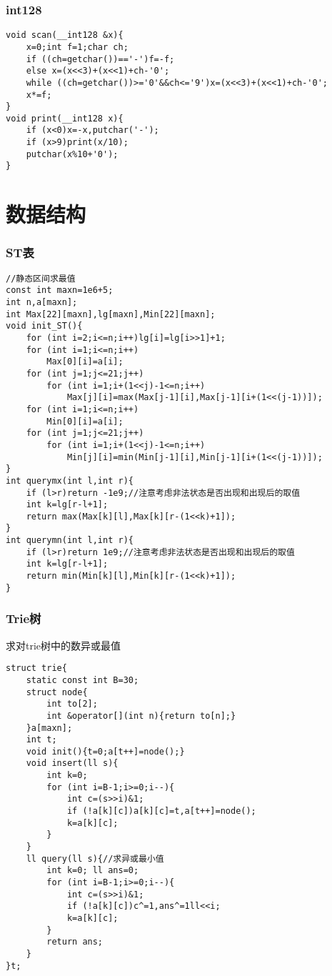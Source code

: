 \documentclass[12pt]{article}
\begin{document}
{{{\section{int128}

{\setmainfont{Consolas}
\begin{lstlisting}
void scan(__int128 &x){
	x=0;int f=1;char ch;
	if ((ch=getchar())=='-')f=-f;
	else x=(x<<3)+(x<<1)+ch-'0';
	while ((ch=getchar())>='0'&&ch<='9')x=(x<<3)+(x<<1)+ch-'0';
	x*=f;
}
void print(__int128 x){
	if (x<0)x=-x,putchar('-');
	if (x>9)print(x/10);
	putchar(x%10+'0');
}
\end{lstlisting}



\part{数据结构}

\section{ST表}

{\setmainfont{Consolas}
\begin{lstlisting}
//静态区间求最值
const int maxn=1e6+5;
int n,a[maxn];
int Max[22][maxn],lg[maxn],Min[22][maxn];
void init_ST(){
    for (int i=2;i<=n;i++)lg[i]=lg[i>>1]+1;
    for (int i=1;i<=n;i++)
        Max[0][i]=a[i];
    for (int j=1;j<=21;j++)
        for (int i=1;i+(1<<j)-1<=n;i++)
            Max[j][i]=max(Max[j-1][i],Max[j-1][i+(1<<(j-1))]);
    for (int i=1;i<=n;i++)
        Min[0][i]=a[i];
    for (int j=1;j<=21;j++)
        for (int i=1;i+(1<<j)-1<=n;i++)
            Min[j][i]=min(Min[j-1][i],Min[j-1][i+(1<<(j-1))]);
}
int querymx(int l,int r){
    if (l>r)return -1e9;//注意考虑非法状态是否出现和出现后的取值
    int k=lg[r-l+1];
    return max(Max[k][l],Max[k][r-(1<<k)+1]);
}
int querymn(int l,int r){
    if (l>r)return 1e9;//注意考虑非法状态是否出现和出现后的取值
    int k=lg[r-l+1];
    return min(Min[k][l],Min[k][r-(1<<k)+1]);
}
\end{lstlisting}



\section{Trie树}

求对trie树中的数异或最值

{\setmainfont{Consolas}
\begin{lstlisting}
struct trie{
	static const int B=30;
	struct node{
		int to[2];
		int &operator[](int n){return to[n];}
	}a[maxn];
	int t;
	void init(){t=0;a[t++]=node();}
	void insert(ll s){
		int k=0;
		for (int i=B-1;i>=0;i--){
			int c=(s>>i)&1;
			if (!a[k][c])a[k][c]=t,a[t++]=node();
			k=a[k][c];
		}
	}
	ll query(ll s){//求异或最小值
		int k=0; ll ans=0;
		for (int i=B-1;i>=0;i--){
			int c=(s>>i)&1;
			if (!a[k][c])c^=1,ans^=1ll<<i;
			k=a[k][c];
		}
		return ans;
	}
}t;
\end{lstlisting}



}}}}}}
\end{document}
